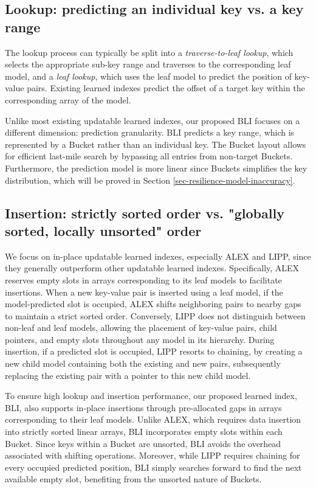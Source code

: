 \subsection{Lookup: predicting an individual key vs. a key range}
The lookup process can typically be split into a \textit{traverse-to-leaf lookup}, which selects the appropriate sub-key range and traverses to the corresponding leaf model, and a \textit{leaf lookup}, which uses the leaf model to predict the position of key-value pairs. Existing learned indexes \cite{ferragina2020pgm, tang2020xindex, li2021finedex, galakatos2019fiting, ding2020alex, wongkham2022updatable} predict the offset of a target key within the corresponding array of the model.

Unlike most existing updatable learned indexes, our proposed BLI focuses on a different dimension: prediction granularity.
BLI predicts a key range, which is represented by a Bucket rather than an individual key. The Bucket layout allows for efficient last-mile search by bypassing all entries from non-target Buckets. Furthermore, the prediction model is more linear since Buckets simplifies the key distribution, which will be proved in Section \ref{sec-resilience-model-inaccuracy}.

\subsection{Insertion: strictly sorted order vs. "globally sorted, locally unsorted" order }
We focus on in-place updatable learned indexes, especially ALEX and LIPP, since they generally outperform other updatable learned indexes. Specifically, ALEX reserves empty slots in arrays corresponding to its leaf models to facilitate insertions. When a new key-value pair is inserted using a leaf model, if the model-predicted slot is occupied, ALEX shifts neighboring pairs to nearby gaps to maintain a strict sorted order. %
Conversely, LIPP does not distinguish between non-leaf and leaf models, allowing the placement of key-value pairs, child pointers, and empty slots throughout any model in its hierarchy. During insertion, if a predicted slot is occupied, LIPP resorts to chaining, %
by creating a new child model containing both the existing and new pairs, subsequently replacing the existing pair with a pointer to this new child model.

To ensure high lookup and insertion performance, our proposed learned index, BLI, also supports in-place insertions through pre-allocated gaps in arrays corresponding to their leaf models. Unlike ALEX, which requires data insertion into strictly sorted linear arrays, BLI incorporates empty slots within each Bucket. Since keys within a Bucket are unsorted, BLI avoids the overhead associated with shifting operations. Moreover, while LIPP requires chaining for every occupied predicted position, BLI simply searches forward to find the next available empty slot, benefiting from the unsorted nature of Buckets.

